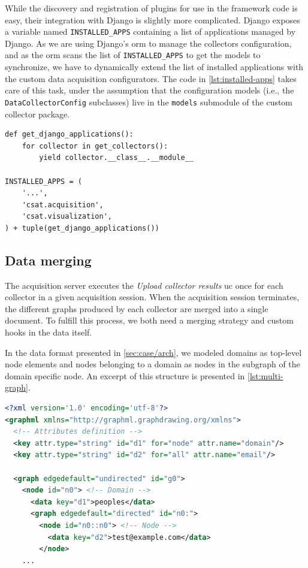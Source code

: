 While the discovery and registration of plugins for use in the framework code is easy, their integration with Django is slightly more complicated. Django exposes a variable named \texttt{INSTALLED\BreakableSlash{}\_APPS} containing a list of applications managed by Django. As we are using Django's \gls{orm} to manage the collectors configuration, and as the \gls{orm} scans the list of \texttt{INSTALLED\_APPS} to get the models to synchronize, we have to dynamically extend the list of installed applications with the custom data acquisition configurators. The code in \ref{lst:installed-apps} takes care of this task, under the assumption that the configuration models (i.e., the \texttt{DataCollectorConfig} subclasses) live in the \texttt{models} submodule of the custom collector package.

\begin{lstlisting}[caption={Dynamic construction of the list of installed apps.},label=lst:installed-apps]
def get_django_applications():
    for collector in get_collectors():
        yield collector.__class__.__module__

INSTALLED_APPS = (
    '...',
    'csat.acquisition',
    'csat.visualization',
) + tuple(get_django_applications())
\end{lstlisting}


\subsection{Data merging}
\label{sec:acquisition/implementation/merging}

The acquisition server executes the \emph{Upload collector results} \gls{uc} once for each collector in a given acquisition session. When the acquisition session terminates, the different graphs produced by each collector are merged into a single document. To fulfill this process, we both need a merging strategy and custom hooks in the data itself.

In the data format presented in \vref{sec:case/arch}, we modeled domains as top-level node elements and nodes belonging to a domain as nodes in the subgraph of the domain specific node. An excerpt of this structure is presented in \vref{lst:multi-graph}.

\begin{lstlisting}[caption={Multi-domain graphs in GraphML format.},label=lst:multi-graph,language=xml]
<?xml version='1.0' encoding='utf-8'?>
<graphml xmlns="http://graphml.graphdrawing.org/xmlns">
  <!-- Attributes definition -->
  <key attr.type="string" id="d1" for="node" attr.name="domain"/>
  <key attr.type="string" id="d2" for="all" attr.name="email"/>

  <graph edgedefault="undirected" id="g0">
    <node id="n0"> <!-- Domain -->
      <data key="d1">peoples</data>
      <graph edgedefault="directed" id="n0:">
        <node id="n0::n0"> <!-- Node -->
          <data key="d2">test@example.com</data>
        </node>
    ...
\end{lstlisting}

